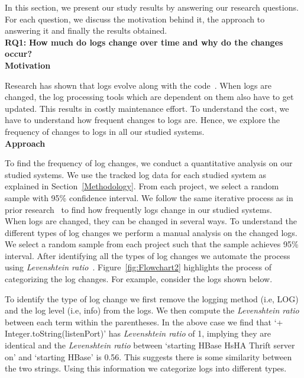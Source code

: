 In this section, we present our study results by answering our research questions. For each question, we discuss the motivation behind it, the approach to answering it and finally the results obtained. 
\\

\noindent\textbf{RQ1:} \textbf{How much do logs change over time and why do the changes occur?}
\\

\noindent\textbf{Motivation}

Research has shown that logs evolve along with the code~\cite{IanContextinformation}. When logs are changed, the log  processing tools which are dependent on them also have to get updated. This results in costly maintenance effort. To understand the cost, we have to understand how frequent changes to logs are. Hence, we explore the frequency of changes to logs in all our studied systems.\\

\noindent \textbf{Approach}

To find the frequency of log changes, we conduct a quantitative analysis on our studied systems. We use the tracked log data for each studied system as explained in Section~\ref{Methodology}. From each project, we select a random sample with 95\% confidence interval. We follow the same iterative process as in prior research~\cite{IanIcesm} to find how frequently logs change in our studied systems. \\

When logs are changed, they can be changed in several ways. To understand the different types of log changes we perform a manual analysis on the changed logs. We select a random sample from each project such that the sample achieves 95\% interval. After identifying all the types of log changes we automate the process using \textsl{Levenshtein ratio}~\cite{levenshteinratio}. Figure~\ref{fig:Flowchart2} highlights the process of categorizing the log changes. For example, 
consider the logs shown below. 




To identify the type of log change we first remove the logging method (i.e, LOG) and the log level (i.e, info) from the logs. We then compute the \textsl{Levenshtein ratio} between each term within the parentheses. In the above case we find that `+ Integer.toString(listenPort)' has \textsl{Levenshtein ratio} of 1, implying they are identical and the \textsl{Levenshtein ratio} between `starting HBase HsHA Thrift server on' and `starting HBase' is 0.56. This suggests there is some similarity between the two strings. Using this information we categorize logs into different types.

